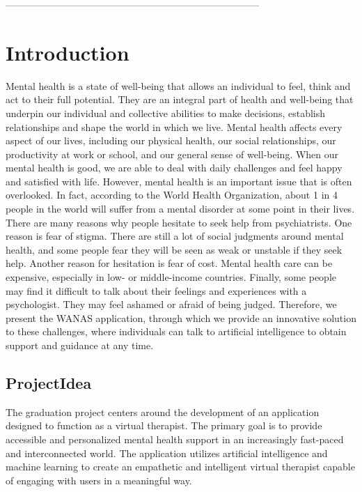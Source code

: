  ------------------------------------------------------------------------------
\chapter{Introduction} %
Mental health is a state of well-being that allows an individual to feel, think and act to their full potential. They are an integral part of health and well-being that underpin our individual and collective abilities to make decisions, establish relationships and shape the world in which we live. Mental health affects every aspect of our lives, including our physical health, our social relationships, our productivity at work or school, and our general sense of well-being. When our mental health is good, we are able to deal with daily challenges and feel happy and satisfied with life. However, mental health is an important issue that is often overlooked. In fact, according to the World Health Organization, about 1 in 4 people in the world will suffer from a mental disorder at some point in their lives. There are many reasons why people hesitate to seek help from psychiatrists. One reason is fear of stigma. There are still a lot of social judgments around mental health, and some people fear they will be seen as weak or unstable if they seek help. Another reason for hesitation is fear of cost. Mental health care can be expensive, especially in low- or middle-income countries. Finally, some people may find it difficult to talk about their feelings and experiences with a psychologist. They may feel ashamed or afraid of being judged. Therefore, we present the WANAS application, through which we provide an innovative solution to these challenges, where individuals can talk to artificial intelligence to obtain support and guidance at any time.
\section{ProjectIdea} %
The graduation project centers around the development of an application designed to function as a virtual therapist. The primary goal is to provide accessible and personalized mental health support in an increasingly fast-paced and interconnected world. The application utilizes artificial intelligence and machine learning to create an empathetic and intelligent virtual therapist capable of engaging with users in a meaningful way.

